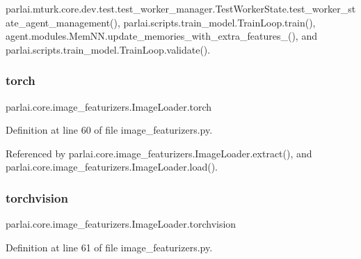 parlai.\+mturk.\+core.\+dev.\+test.\+test\+\_\+worker\+\_\+manager.\+Test\+Worker\+State.\+test\+\_\+worker\+\_\+state\+\_\+agent\+\_\+management(), parlai.\+scripts.\+train\+\_\+model.\+Train\+Loop.\+train(), agent.\+modules.\+Mem\+N\+N.\+update\+\_\+memories\+\_\+with\+\_\+extra\+\_\+features\+\_\+(), and parlai.\+scripts.\+train\+\_\+model.\+Train\+Loop.\+validate().

\mbox{\label{classparlai_1_1core_1_1image__featurizers_1_1ImageLoader_a4b3a087dd54203cca9f3a8665a48c6d7}} 
\subsubsection{\texorpdfstring{torch}{torch}}
{\footnotesize\ttfamily parlai.\+core.\+image\+\_\+featurizers.\+Image\+Loader.\+torch}



Definition at line 60 of file image\+\_\+featurizers.\+py.



Referenced by parlai.\+core.\+image\+\_\+featurizers.\+Image\+Loader.\+extract(), and parlai.\+core.\+image\+\_\+featurizers.\+Image\+Loader.\+load().

\mbox{\label{classparlai_1_1core_1_1image__featurizers_1_1ImageLoader_a4c2e2d68b78742c614d6a09b8f9c0257}} 
\subsubsection{\texorpdfstring{torchvision}{torchvision}}
{\footnotesize\ttfamily parlai.\+core.\+image\+\_\+featurizers.\+Image\+Loader.\+torchvision}



Definition at line 61 of file image\+\_\+featurizers.\+py.

